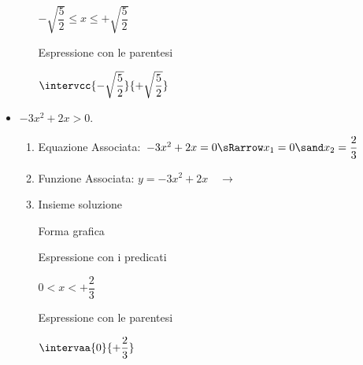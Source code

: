 \begin{esempio}
\begin{itemize}
\begin{enumerate}
\begin{minipage}{.32\textwidth}
 \begin{center}
  \(-\sqrt{\dfrac{5}{2}} \le x \le +\sqrt{\dfrac{5}{2}}\)
  \vspace{1em}
 \end{center}
  \end{minipage}
  \begin{minipage}{.32\textwidth}
  Espressione con le parentesi\\[-.3em]

 \begin{center}
  \(\intervcc{-\sqrt{\dfrac{5}{2}}}{+\sqrt{\dfrac{5}{2}}}\)
  \vspace{.8em}
 \end{center}
  \end{minipage}
\end{enumerate}

\item \(-3x^2 + 2x > 0\).

\begin{enumerate}
 \item
  Equazione Associata:~\(-3x^2 + 2x=0 \sRarrow
                        x_{1}= 0 \sand x_{2}= \dfrac{2}{3}\)
 \item
  \begin{minipage}{.45\textwidth}
  Funzione Associata: \(y = -3x^2 + 2x \quad \rightarrow\)
  \end{minipage}
  \begin{minipage}{.30\textwidth}
  \end{minipage}
 \item
 Insieme soluzione\\

  \begin{minipage}{.32\textwidth}
  Forma grafica\\[-.7em]

 \begin{center}
  \vspace{.4em}
 \end{center}
  \end{minipage}
  \begin{minipage}{.32\textwidth}
  Espressione con i predicati\\[-.3em]

 \begin{center}
  \(0 < x < +\dfrac{2}{3}\)
  \vspace{1em}
 \end{center}
  \end{minipage}
  \begin{minipage}{.32\textwidth}
  Espressione con le parentesi\\[-.3em]

 \begin{center}
  \(\intervaa{0}{+\dfrac{2}{3}}\)
  \vspace{.8em}
 \end{center}
  \end{minipage}
\end{enumerate}

\end{itemize}
\end{esempio}

